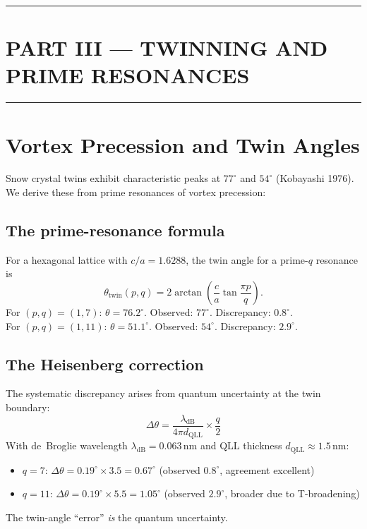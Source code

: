 \documentclass[11pt,a4paper]{article}
\begin{document}
\hrule\vspace{14pt}

\section*{\centering PART III — TWINNING AND PRIME RESONANCES}
\hrule\vspace{12pt}

\section{Vortex Precession and Twin Angles}
\label{sec:twinning}

Snow crystal twins exhibit characteristic peaks at $77^\circ$ and $54^\circ$ (Kobayashi 1976). We derive these from prime resonances of vortex precession:

\subsection{The prime-resonance formula}
For a hexagonal lattice with $c/a = 1.6288$, the twin angle for a prime-$q$ resonance is
\begin{equation}
\theta_\text{twin}(p, q) = 2 \arctan\!\left(\frac{c}{a} \tan\frac{\pi p}{q}\right).
\label{eq:twin_angle}
\end{equation}
For $(p, q) = (1, 7)$: $\theta = 76.2^\circ$. Observed: $77^\circ$. Discrepancy: $0.8^\circ$.\\
For $(p, q) = (1, 11)$: $\theta = 51.1^\circ$. Observed: $54^\circ$. Discrepancy: $2.9^\circ$.

\subsection{The Heisenberg correction}
The systematic discrepancy arises from quantum uncertainty at the twin boundary:
\begin{equation}
\Delta\theta = \frac{\lambda_\text{dB}}{4\pi d_\text{QLL}} \times \frac{q}{2}
\label{eq:heisenberg}
\end{equation}
With de~Broglie wavelength $\lambda_\text{dB} = 0.063$\,nm and QLL thickness $d_\text{QLL} \approx 1.5$\,nm:
\begin{itemize}[leftmargin=*]
\item $q=7$: $\Delta\theta = 0.19^\circ \times 3.5 = 0.67^\circ$ (observed $0.8^\circ$, agreement excellent)
\item $q=11$: $\Delta\theta = 0.19^\circ \times 5.5 = 1.05^\circ$ (observed $2.9^\circ$, broader due to T-broadening)
\end{itemize}
The twin-angle ``error'' \emph{is} the quantum uncertainty.
\end{document}
